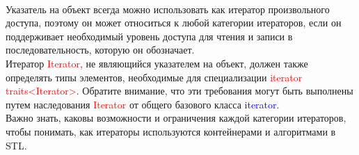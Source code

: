 \documentclass[a4paper,10pt]{article}
\begin{document}
\\Указатель на объект всегда можно использовать как итератор произвольного доступа, поэтому он может относиться к любой категории итераторов, если он поддерживает необходимый уровень доступа для чтения и записи в последовательность, которую он обозначает.
\\

Итератор \textcolor{red}{Iterator}, не являющийся указателем на объект, должен также определять типы элементов, необходимые для специализации \textcolor{red}{iterator\underline{ }traits<Iterator>}. Обратите внимание, что эти требования могут быть выполнены путем наследования \textcolor{red}{Iterator} от общего базового класса \textcolor{blue}{iterator}.
\\

Важно знать, каковы возможности и ограничения каждой категории итераторов, чтобы понимать, как итераторы используются контейнерами и алгоритмами в STL.
\\
\end{document}

